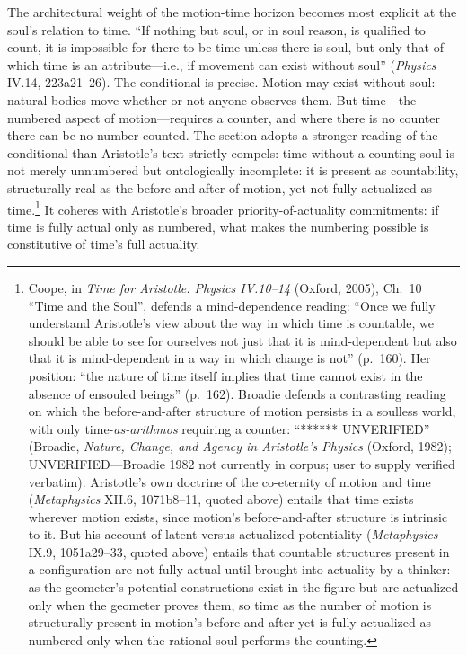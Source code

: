 \documentclass{article}
\begin{document}
The architectural weight of the motion-time horizon becomes most explicit at the soul's relation to time. ``If nothing but soul, or in soul reason, is qualified to count, it is impossible for there to be time unless there is soul, but only that of which time is an attribute---i.e., if movement can exist without soul'' (\textit{Physics} IV.14, 223a21--26). The conditional is precise. Motion may exist without soul: natural bodies move whether or not anyone observes them. But time---the numbered aspect of motion---requires a counter, and where there is no counter there can be no number counted. The section adopts a stronger reading of the conditional than Aristotle's text strictly compels: time without a counting soul is not merely unnumbered but ontologically incomplete: it is present as countability, structurally real as the before-and-after of motion, yet not fully actualized as time.\footnote{Coope, in \textit{Time for Aristotle: Physics IV.10--14} (Oxford, 2005), Ch.~10 ``Time and the Soul'', defends a mind-dependence reading: ``Once we fully understand Aristotle's view about the way in which time is countable, we should be able to see for ourselves not just that it is mind-dependent but also that it is mind-dependent in a way in which change is not'' (p.~160). Her position: ``the nature of time itself implies that time cannot exist in the absence of ensouled beings'' (p.~162). Broadie defends a contrasting reading on which the before-and-after structure of motion persists in a soulless world, with only time-\textit{as-arithmos} requiring a counter: ``****** UNVERIFIED'' (Broadie, \textit{Nature, Change, and Agency in Aristotle's Physics} (Oxford, 1982); UNVERIFIED---Broadie 1982 not currently in corpus; user to supply verified verbatim). Aristotle's own doctrine of the co-eternity of motion and time (\textit{Metaphysics} XII.6, 1071b8--11, quoted above) entails that time exists wherever motion exists, since motion's before-and-after structure is intrinsic to it. But his account of latent versus actualized potentiality (\textit{Metaphysics} IX.9, 1051a29--33, quoted above) entails that countable structures present in a configuration are not fully actual until brought into actuality by a thinker: as the geometer's potential constructions exist in the figure but are actualized only when the geometer proves them, so time as the number of motion is structurally present in motion's before-and-after yet is fully actualized as numbered only when the rational soul performs the counting.} It coheres with Aristotle's broader priority-of-actuality commitments: if time is fully actual only as numbered, what makes the numbering possible is constitutive of time's full actuality.
\end{document}
